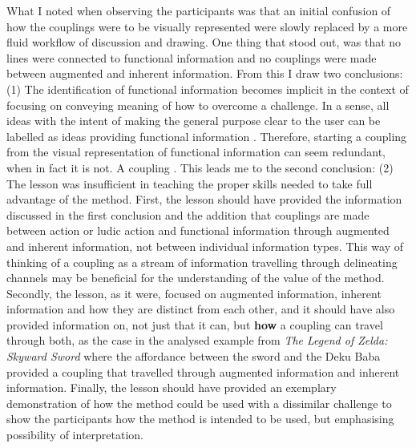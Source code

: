 What I noted when observing the participants was that an initial confusion of how the couplings were to be visually represented were slowly replaced by a more fluid workflow of discussion and drawing. One thing that stood out, was that no lines were connected to functional information and no couplings were made between augmented and inherent information. From this I draw two conclusions: (1) The identification of functional information becomes implicit in the context of focusing on conveying meaning of how to overcome a challenge. In a sense, all ideas with the intent of making the general purpose clear to the user can be labelled as ideas providing functional information \cite{frogger}. Therefore, starting a coupling from the visual representation of functional information can seem redundant, when in fact it is not. A coupling . This leads me to the second conclusion: (2) The lesson was insufficient in teaching the proper skills needed to take full advantage of the method. First, the lesson should have provided the information discussed in the first conclusion and the addition that couplings are made between action or ludic action and functional information through augmented and inherent information, not between individual information types. This way of thinking of a coupling as a stream of information travelling through delineating channels may be beneficial for the understanding of the value of the method. Secondly, the lesson, as it were, focused on augmented information, inherent information and how they are distinct from each other, and it should have also provided information on, not just that it can, but \textbf{how} a coupling can travel through both, as the case in the analysed example from \textit{The Legend of Zelda: Skyward Sword} where the affordance between the sword and the Deku Baba provided a coupling that travelled through augmented information and inherent information. Finally, the lesson should have provided an exemplary demonstration of how the method could be used with a dissimilar challenge to show the participants how the method is intended to be used, but emphasising possibility of interpretation.

